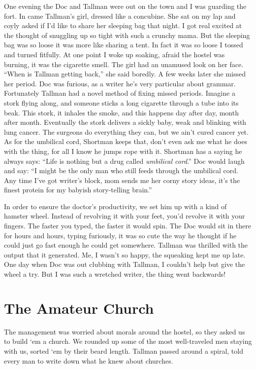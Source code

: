 \documentclass[oneside]{book}
\begin{document}
One evening the Doc and Tallman were out on the town and I was guarding the fort.
In came Tallman's girl, dressed like a concubine.  She sat on my lap and coyly asked if
I'd like to share her sleeping bag that night.  I got real excited at the thought of
snuggling up so tight with such a crunchy mama.  But the sleeping bag was so loose it was
more like sharing a tent.  In fact it was so loose I tossed and turned fitfully.  At one
point I woke up soaking, afraid the hostel was burning, it was the cigarette smell.
The girl had an unamused look on her face.  ``When is Tallman getting back,'' she said boredly.
A few weeks later she missed her period.  Doc was furious, as a writer he's very
particular about grammar.  Fortunately Tallman had a novel method of fixing missed
periods.  Imagine a stork flying along, and someone sticks a long cigarette through a tube
into its beak.  This stork, it inhales the smoke, and this happens day after day, month
after month.  Eventually the stork delivers a sickly baby, weak and blinking with lung
cancer.  The surgeons do everything they can, but we ain't cured cancer yet.  As for the
umbilical cord, Shortman keeps that, don't even ask me what he does with the thing,
for all I know he jumps rope with it.
Shortman has a saying he always says:  ``Life is nothing but a drug called \emph{umbilical
cord}.''  Doc would laugh and say:  ``I might be the only man who still feeds through the
umbilical cord.  Any time I've got writer's block, mom sends me her corny story ideas, it's
the finest protein for my babyish story-telling brain.''

In order to ensure the doctor's productivity, we set him up with a kind of hamster
wheel.  Instead of revolving it with your feet, you'd revolve it with your fingers.
The faster you typed, the faster it would spin.  The Doc would sit in there for hours
and hours, typing furiously, it was so cute the way he thought if he could just go
fast enough he could get somewhere.  Tallman was thrilled with the output that it
generated.  Me, I wasn't so happy, the squeaking kept me up late.
One day when Doc was out clubbing with Tallman, I couldn't help but give the wheel
a try.  But I was such a wretched writer, the thing went backwards!


\chapter{The Amateur Church}

The management was worried about morals around the hostel, so they asked us to build `em a church.
We rounded up some of the most well-traveled men staying with us, sorted `em by their beard length.
Tallman passed around a spiral,
told every man to write down what he knew about churches.
\end{document}
